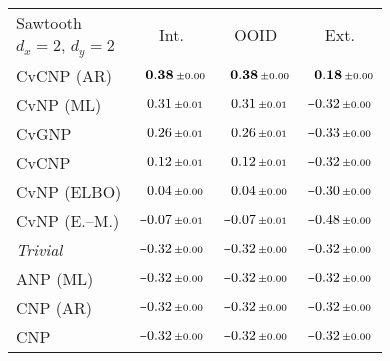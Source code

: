 \begin{tabular}[t]{lccc} 
\toprule 
Sawtooth & \multirow{2}{*}{Int.} & \multirow{2}{*}{OOID} & \multirow{2}{*}{Ext.} \\ 
$d_x\!=\!2,\,d_y\!=\!2$ \\ \midrule 
CvCNP (AR) & $\hphantom{\scalebox{0.7}[1]{$-$}}\mathbf{0.38}\,{ \scriptstyle \pm  0.00 }$ & $\hphantom{\scalebox{0.7}[1]{$-$}}\mathbf{0.38}\,{ \scriptstyle \pm  0.00 }$ & $\hphantom{\scalebox{0.7}[1]{$-$}}\mathbf{0.18}\,{ \scriptstyle \pm  0.00 }$ \\ 
CvNP (ML) & $\hphantom{\scalebox{0.7}[1]{$-$}}0.31\,{ \scriptstyle \pm  0.01 }$ & $\hphantom{\scalebox{0.7}[1]{$-$}}0.31\,{ \scriptstyle \pm  0.01 }$ & $\scalebox{0.7}[1]{$-$}0.32\,{ \scriptstyle \pm  0.00 }$ \\ 
CvGNP & $\hphantom{\scalebox{0.7}[1]{$-$}}0.26\,{ \scriptstyle \pm  0.01 }$ & $\hphantom{\scalebox{0.7}[1]{$-$}}0.26\,{ \scriptstyle \pm  0.01 }$ & $\scalebox{0.7}[1]{$-$}0.33\,{ \scriptstyle \pm  0.00 }$ \\ 
CvCNP & $\hphantom{\scalebox{0.7}[1]{$-$}}0.12\,{ \scriptstyle \pm  0.01 }$ & $\hphantom{\scalebox{0.7}[1]{$-$}}0.12\,{ \scriptstyle \pm  0.01 }$ & $\scalebox{0.7}[1]{$-$}0.32\,{ \scriptstyle \pm  0.00 }$ \\ 
CvNP (ELBO) & $\hphantom{\scalebox{0.7}[1]{$-$}}0.04\,{ \scriptstyle \pm  0.00 }$ & $\hphantom{\scalebox{0.7}[1]{$-$}}0.04\,{ \scriptstyle \pm  0.00 }$ & $\scalebox{0.7}[1]{$-$}0.30\,{ \scriptstyle \pm  0.00 }$ \\ 
CvNP (E.--M.) & $\scalebox{0.7}[1]{$-$}0.07\,{ \scriptstyle \pm  0.01 }$ & $\scalebox{0.7}[1]{$-$}0.07\,{ \scriptstyle \pm  0.01 }$ & $\scalebox{0.7}[1]{$-$}0.48\,{ \scriptstyle \pm  0.00 }$ \\ 
{\normalshape \textit{Trivial}} & $\scalebox{0.7}[1]{$-$}0.32\,{ \scriptstyle \pm  0.00 }$ & $\scalebox{0.7}[1]{$-$}0.32\,{ \scriptstyle \pm  0.00 }$ & $\scalebox{0.7}[1]{$-$}0.32\,{ \scriptstyle \pm  0.00 }$ \\ 
ANP (ML) & $\scalebox{0.7}[1]{$-$}0.32\,{ \scriptstyle \pm  0.00 }$ & $\scalebox{0.7}[1]{$-$}0.32\,{ \scriptstyle \pm  0.00 }$ & $\scalebox{0.7}[1]{$-$}0.32\,{ \scriptstyle \pm  0.00 }$ \\ 
CNP (AR) & $\scalebox{0.7}[1]{$-$}0.32\,{ \scriptstyle \pm  0.00 }$ & $\scalebox{0.7}[1]{$-$}0.32\,{ \scriptstyle \pm  0.00 }$ & $\scalebox{0.7}[1]{$-$}0.32\,{ \scriptstyle \pm  0.00 }$ \\ 
CNP & $\scalebox{0.7}[1]{$-$}0.32\,{ \scriptstyle \pm  0.00 }$ & $\scalebox{0.7}[1]{$-$}0.32\,{ \scriptstyle \pm  0.00 }$ & $\scalebox{0.7}[1]{$-$}0.32\,{ \scriptstyle \pm  0.00 }$ \\ 

\end{tabular}
